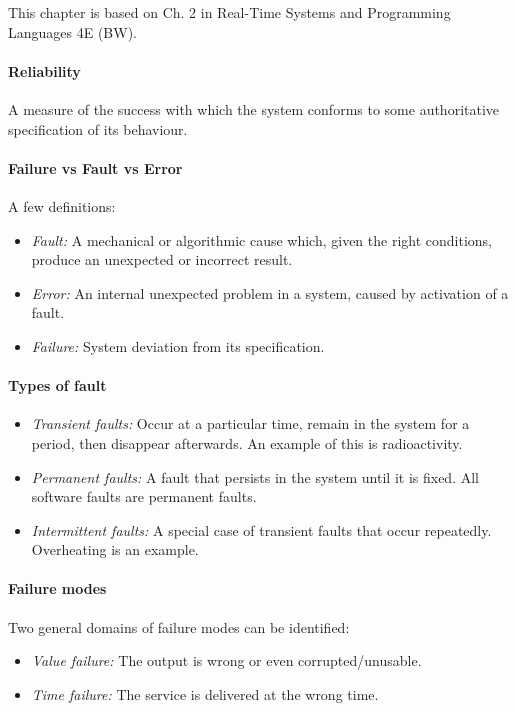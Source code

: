 
This chapter is based on Ch. 2 in Real-Time Systems and Programming Languages 4E (BW).

\sepline

\paragraph{Reliability} A measure of the success with which the system conforms to some authoritative specification of its behaviour.

\paragraph{Failure vs Fault vs Error} A few definitions:
\begin{itemize}
  \item \textit{Fault:} A mechanical or algorithmic cause which, given the right conditions, produce an unexpected or incorrect result.
  \item \textit{Error:} An internal unexpected problem in a system, caused by activation of a fault.
  \item \textit{Failure:} System deviation from its specification.
\end{itemize}



\paragraph{Types of fault}
\begin{itemize}[nolistsep,noitemsep]
  \item \textit{Transient faults:} Occur at a particular time, remain in the system for a period, then disappear afterwards. An example of this is radioactivity.
  \item \textit{Permanent faults:} A fault that persists in the system until it is fixed. All software faults are permanent faults.
  \item \textit{Intermittent faults:} A special case of transient faults that occur repeatedly. Overheating is an example.
\end{itemize}

\paragraph{Failure modes} Two general domains of failure modes can be identified:
\begin{itemize}[nolistsep,noitemsep]
  \item \textit{Value failure:} The output is wrong or even corrupted/unusable.
  \item \textit{Time failure:} The service is delivered at the wrong time.
\end{itemize}

